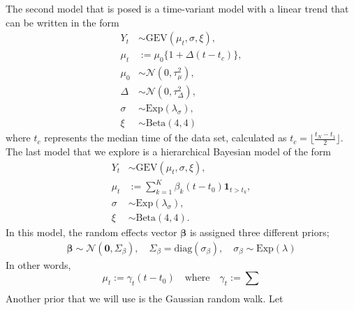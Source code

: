 \documentclass[12pt, a4paper]{article}
\begin{document}
  The second model that is posed is a time-variant model with a linear trend
  that can be written in the form 
  \begin{align*}
    Y_t &\sim \mathrm{GEV}(\mu_t, \sigma, \xi),  \\
    \mu_t &:= \mu_0 \{1 + \Delta (t - t_c)\}, \\
    \mu_0 &\sim \mathcal N(0, \tau_\mu^2), \\
    \Delta &\sim \mathcal N(0, \tau_\Delta^2), \\
    \sigma &\sim \mathrm{Exp}(\lambda_\sigma), \\
    \xi &\sim \mathrm{Beta}(4, 4)
  \end{align*}
  where \(t_c\) represents the median time of the data set, calculated as
  \(t_c = \lfloor \frac{t_N - t_1}{2} \rfloor\). The last model that we explore 
  is a hierarchical Bayesian model of the form
  \begin{align*}
    Y_t &\sim \mathrm{GEV}(\mu_t, \sigma, \xi), \\
    \mu_t &:= \sum_{k = 1}^K \beta_k (t - t_0) \mathbf 1_{t > t_k}, \\
    \sigma &\sim \mathrm{Exp}(\lambda_\sigma), \\
    \xi &\sim \mathrm{Beta}(4, 4).
  \end{align*}
  In this model, the random effects vector \(\bm \beta\) is assigned three
  different priors;
  \begin{align*}
    \bm \beta \sim \mathcal N(\bm 0, \Sigma_\beta),
    \quad \Sigma_\beta = \mathrm{diag}(\sigma_\beta), \quad
    \sigma_\beta \sim \mathrm{Exp}(\lambda)
  \end{align*}
  In other words,
  \[
    \mu_t := \gamma_t (t - t_0) \quad \text{where} \quad
    \gamma_t := \sum_{}
  \]
  Another prior that we will use is the Gaussian random walk. Let
\end{document}
